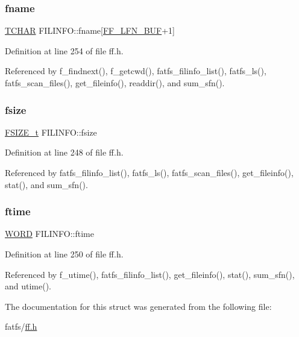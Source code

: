 \mbox{\label{structFILINFO_aab1ba8d85467346a528f7569e4d15381}} 
\subsubsection{\texorpdfstring{fname}{fname}}
{\footnotesize\ttfamily \hyperlink{ff_8h_a03bdb8ce5895c7e261aadc2529637546}{T\+C\+H\+AR} F\+I\+L\+I\+N\+F\+O\+::fname\mbox{[}\hyperlink{ffconf_8h_a7d29ac29d2d2db71cc7d045ea38fa927}{F\+F\+\_\+\+L\+F\+N\+\_\+\+B\+UF}+1\mbox{]}}



Definition at line 254 of file ff.\+h.



Referenced by f\+\_\+findnext(), f\+\_\+getcwd(), fatfs\+\_\+filinfo\+\_\+list(), fatfs\+\_\+ls(), fatfs\+\_\+scan\+\_\+files(), get\+\_\+fileinfo(), readdir(), and sum\+\_\+sfn().

\mbox{\label{structFILINFO_a9e5b78ed7190f73de3ebcbdfbd6d1844}} 
\subsubsection{\texorpdfstring{fsize}{fsize}}
{\footnotesize\ttfamily \hyperlink{ff_8h_a3fc0992ad7436250b6b1a0592214b7f2}{F\+S\+I\+Z\+E\+\_\+t} F\+I\+L\+I\+N\+F\+O\+::fsize}



Definition at line 248 of file ff.\+h.



Referenced by fatfs\+\_\+filinfo\+\_\+list(), fatfs\+\_\+ls(), fatfs\+\_\+scan\+\_\+files(), get\+\_\+fileinfo(), stat(), and sum\+\_\+sfn().

\mbox{\label{structFILINFO_ae0f751b79621bf7b29669f177bbe6b9a}} 
\subsubsection{\texorpdfstring{ftime}{ftime}}
{\footnotesize\ttfamily \hyperlink{ff_8h_a197942eefa7db30960ae396d68339b97}{W\+O\+RD} F\+I\+L\+I\+N\+F\+O\+::ftime}



Definition at line 250 of file ff.\+h.



Referenced by f\+\_\+utime(), fatfs\+\_\+filinfo\+\_\+list(), get\+\_\+fileinfo(), stat(), sum\+\_\+sfn(), and utime().



The documentation for this struct was generated from the following file\+:\begin{DoxyCompactItemize}
\item 
fatfs/\hyperlink{ff_8h}{ff.\+h}\end{DoxyCompactItemize}
